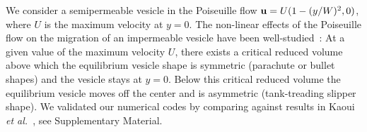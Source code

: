 \documentclass[9pt,twocolumn,twoside,lineno]{pnas-new}
\begin{document}
We consider a semipermeable vesicle in the Poiseuille flow $\mathbf{u} =
U(1-(y/W)^2,0)$, where $U$ is the maximum velocity at $y=0$. The
non-linear effects of the Poiseuille flow on the migration of an
impermeable vesicle have been well-studied~\cite{kao-bir-mis2009}: At a
given value of the maximum velocity $U$, there exists a critical reduced
volume above which the equilibrium vesicle shape is symmetric (parachute
or bullet shapes) and the vesicle stays at $y=0$. Below this critical
reduced volume the equilibrium vesicle moves off the center and is
asymmetric (tank-treading slipper shape). We validated our numerical
codes by comparing against results in Kaoui {\em et
al.}~\cite{kao-bir-mis2009}, see Supplementary Material.

%
%
%
%
%
%
\end{document}
